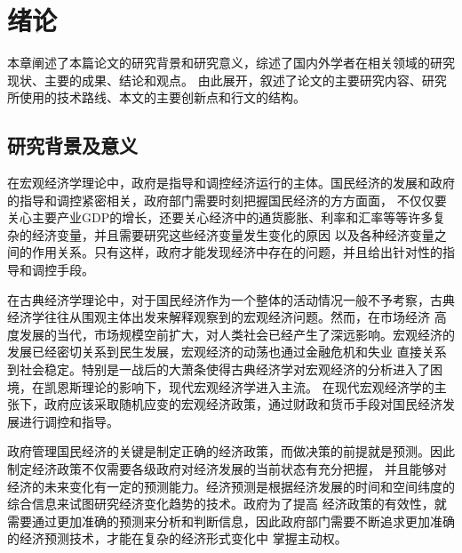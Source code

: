\section{绪论}
本章阐述了本篇论文的研究背景和研究意义，综述了国内外学者在相关领域的研究现状、主要的成果、结论和观点。
由此展开，叙述了论文的主要研究内容、研究所使用的技术路线、本文的主要创新点和行文的结构。
\subsection{研究背景及意义}
在宏观经济学理论中，政府是指导和调控经济运行的主体。国民经济的发展和政府的指导和调控紧密相关，政府部门需要时刻把握国民经济的方方面面，
不仅仅要关心主要产业GDP的增长，还要关心经济中的通货膨胀、利率和汇率等等许多复杂的经济变量，并且需要研究这些经济变量发生变化的原因
以及各种经济变量之间的作用关系。只有这样，政府才能发现经济中存在的问题，并且给出针对性的指导和调控手段。

在古典经济学理论中，对于国民经济作为一个整体的活动情况一般不予考察，古典经济学往往从围观主体出发来解释观察到的宏观经济问题。然而，在市场经济
高度发展的当代，市场规模空前扩大，对人类社会已经产生了深远影响。宏观经济的发展已经密切关系到民生发展，宏观经济的动荡也通过金融危机和失业
直接关系到社会稳定。特别是一战后的大萧条使得古典经济学对宏观经济的分析进入了困境，在凯恩斯理论的影响下，现代宏观经济学进入主流。
在现代宏观经济学的主张下，政府应该采取随机应变的宏观经济政策，通过财政和货币手段对国民经济发展进行调控和指导。


政府管理国民经济的关键是制定正确的经济政策，而做决策的前提就是预测。因此制定经济政策不仅需要各级政府对经济发展的当前状态有充分把握，
并且能够对经济的未来变化有一定的预测能力。经济预测是根据经济发展的时间和空间纬度的综合信息来试图研究经济变化趋势的技术。政府为了提高
经济政策的有效性，就需要通过更加准确的预测来分析和判断信息，因此政府部门需要不断追求更加准确的经济预测技术，才能在复杂的经济形式变化中
掌握主动权。

